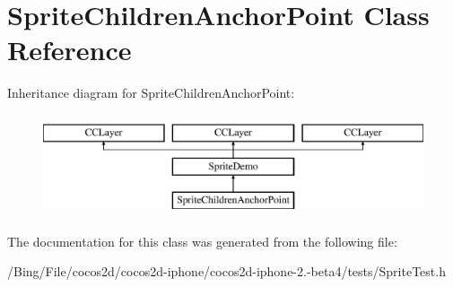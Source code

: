 \hypertarget{interface_sprite_children_anchor_point}{\section{Sprite\-Children\-Anchor\-Point Class Reference}
\label{interface_sprite_children_anchor_point}
}
Inheritance diagram for Sprite\-Children\-Anchor\-Point\-:\begin{figure}[H]
\begin{center}
\leavevmode
\includegraphics[height=3.000000cm]{interface_sprite_children_anchor_point}
\end{center}
\end{figure}


The documentation for this class was generated from the following file\-:\begin{DoxyCompactItemize}
\item 
/\-Bing/\-File/cocos2d/cocos2d-\/iphone/cocos2d-\/iphone-\/2.-\/beta4/tests/Sprite\-Test.\-h\end{DoxyCompactItemize}
